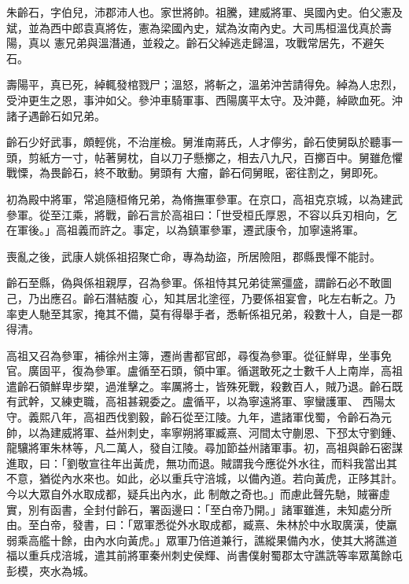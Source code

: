 
\begin{pinyinscope}

 朱齡石，字伯兒，沛郡沛人也。家世將帥。祖騰，建威將軍、吳國內史。伯父憲及斌，並為西中郎袁真將佐，憲為梁國內史，斌為汝南內史。大司馬桓溫伐真於壽陽，真以
 憲兄弟與溫潛通，並殺之。齡石父綽逃走歸溫，攻戰常居先，不避矢石。



 壽陽平，真已死，綽輒發棺戮尸；溫怒，將斬之，溫弟沖苦請得免。綽為人忠烈，受沖更生之恩，事沖如父。參沖車騎軍事、西陽廣平太守。及沖薨，綽歐血死。沖諸子遇齡石如兄弟。



 齡石少好武事，頗輕佻，不治崖檢。舅淮南蔣氏，人才儜劣，齡石使舅臥於聽事一頭，剪紙方一寸，帖著舅枕，自以刀子懸擲之，相去八九尺，百擲百中。舅雖危懼戰慄，為畏齡石，終不敢動。舅頭有
 大瘤，齡石伺舅眠，密往割之，舅即死。



 初為殿中將軍，常追隨桓脩兄弟，為脩撫軍參軍。在京口，高祖克京城，以為建武參軍。從至江乘，將戰，齡石言於高祖曰：「世受桓氏厚恩，不容以兵刃相向，乞在軍後。」高祖義而許之。事定，以為鎮軍參軍，遷武康令，加寧遠將軍。



 喪亂之後，武康人姚係祖招聚亡命，專為劫盜，所居險阻，郡縣畏憚不能討。



 齡石至縣，偽與係祖親厚，召為參軍。係祖恃其兄弟徒黨彊盛，謂齡石必不敢圖己，乃出應召。齡石潛結腹
 心，知其居北塗徑，乃要係祖宴會，叱左右斬之。乃率吏人馳至其家，掩其不備，莫有得舉手者，悉斬係祖兄弟，殺數十人，自是一郡得清。



 高祖又召為參軍，補徐州主簿，遷尚書都官郎，尋復為參軍。從征鮮卑，坐事免官。廣固平，復為參軍。盧循至石頭，領中軍。循選敢死之士數千人上南岸，高祖遣齡石領鮮卑步槊，過淮擊之。率厲將士，皆殊死戰，殺數百人，賊乃退。齡石既有武幹，又練吏職，高祖甚親委之。盧循平，以為寧遠將軍、寧蠻護軍、
 西陽太守。義熙八年，高祖西伐劉毅，齡石從至江陵。九年，遣諸軍伐蜀，令齡石為元帥，以為建威將軍、益州刺史，率寧朔將軍臧熹、河間太守蒯恩、下邳太守劉鍾、龍驤將軍朱林等，凡二萬人，發自江陵。尋加節益州諸軍事。初，高祖與齡石密謀進取，曰：「劉敬宣往年出黃虎，無功而退。賊謂我今應從外水往，而料我當出其不意，猶從內水來也。如此，必以重兵守涪城，以備內道。若向黃虎，正陊其計。今以大眾自外水取成都，疑兵出內水，此
 制敵之奇也。」而慮此聲先馳，賊審虛實，別有函書，全封付齡石，署函邊曰：「至白帝乃開。」諸軍雖進，未知處分所由。至白帝，發書，曰：「眾軍悉從外水取成都，臧熹、朱林於中水取廣漢，使羸弱乘高艦十餘，由內水向黃虎。」眾軍乃倍道兼行，譙縱果備內水，使其大將譙道福以重兵戍涪城，遣其前將軍秦州刺史侯輝、尚書僕射蜀郡太守譙詵等率眾萬餘屯彭模，夾水為城。




\end{pinyinscope}
